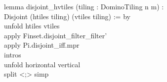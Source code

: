 \begin{leancode}
lemma disjoint\_hvtiles (tiling : DominoTiling n m) : \\
\tab Disjoint (htiles tiling) (vtiles tiling) := by \\
\tab unfold htiles vtiles \\
\tab apply Finset.disjoint\_filter\_filter' \\
\tab apply Pi.disjoint\_iff.mpr \\
\tab intros \\
\tab unfold horizontal vertical \\
\tab split <;> simp \\
\end{leancode}
